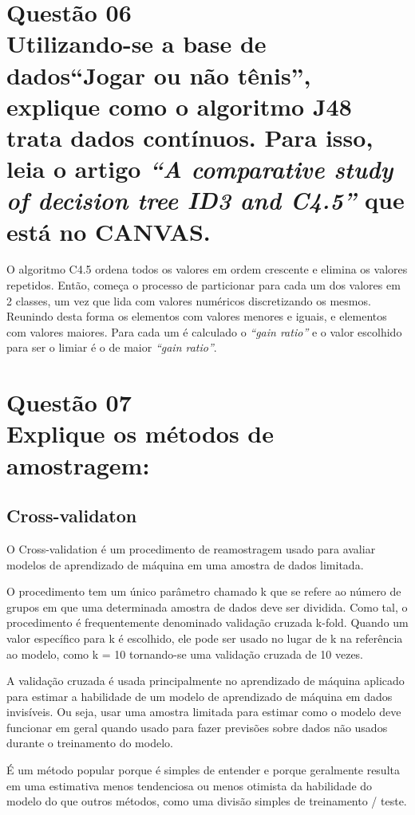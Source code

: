 \documentclass[12pt]{article}
\begin{document}
\section{Questão 06\\
Utilizando-se a base de dados“Jogar ou não tênis”, explique como o algoritmo J48 trata dados contínuos.
Para isso, leia o artigo \textit{“A comparative study of decision tree ID3 and C4.5”} que está no CANVAS.
}
O algoritmo C4.5 ordena todos os valores em ordem crescente e elimina os valores repetidos.
Então, começa o processo de particionar para cada um dos valores em 2 classes, um vez que lida com valores numéricos discretizando os mesmos.
Reunindo desta forma os elementos com valores menores e iguais, e elementos com valores maiores.
Para cada um é calculado o \textit{“gain ratio”} e o valor escolhido para ser o limiar é o de maior \textit{“gain ratio”}.

\section{Questão 07\\
Explique os métodos de amostragem:
}

\subsection{Cross-validaton}
O Cross-validation é um procedimento de reamostragem usado para avaliar modelos de aprendizado de máquina em uma amostra de dados limitada.

O procedimento tem um único parâmetro chamado k que se refere ao número de grupos em que uma determinada amostra de dados deve ser dividida. Como tal, o procedimento é frequentemente denominado validação cruzada k-fold. Quando um valor específico para k é escolhido, ele pode ser usado no lugar de k na referência ao modelo, como k = 10 tornando-se uma validação cruzada de 10 vezes.

A validação cruzada é usada principalmente no aprendizado de máquina aplicado para estimar a habilidade de um modelo de aprendizado de máquina em dados invisíveis. Ou seja, usar uma amostra limitada para estimar como o modelo deve funcionar em geral quando usado para fazer previsões sobre dados não usados durante o treinamento do modelo.

É um método popular porque é simples de entender e porque geralmente resulta em uma estimativa menos tendenciosa ou menos otimista da habilidade do modelo do que outros métodos, como uma divisão simples de treinamento / teste.
\end{document}
